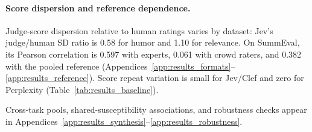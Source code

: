 \paragraph{Score dispersion and reference dependence.}
Judge-score dispersion relative to human ratings varies by dataset: Jev's judge/human SD ratio is 0.58 for humor and 1.10 for relevance. On SummEval, its Pearson correlation is 0.597 with experts, 0.061 with crowd raters, and 0.382 with the pooled reference (Appendices~\ref{app:results_formats}--\ref{app:results_reference}). Score repeat variation is small for Jev/Clef and zero for Perplexity (Table~\ref{tab:results_baseline}).

Cross-task pools, shared-susceptibility associations, and robustness checks appear in Appendices~\ref{app:results_synthesis}--\ref{app:results_robustness}.
\label{sec:results_end}
\FloatBarrier

